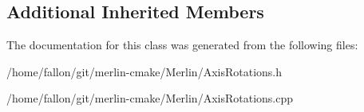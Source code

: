 \subsection*{Additional Inherited Members}


The documentation for this class was generated from the following files\+:\begin{DoxyCompactItemize}
\item 
/home/fallon/git/merlin-\/cmake/\+Merlin/Axis\+Rotations.\+h\item 
/home/fallon/git/merlin-\/cmake/\+Merlin/Axis\+Rotations.\+cpp\end{DoxyCompactItemize}
